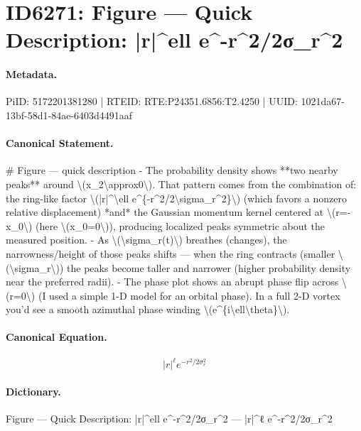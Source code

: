 \section*{ID6271: Figure — Quick Description: |r|\textasciicircum{}ell e\textasciicircum{}-r\textasciicircum{}2/2σ\_r\textasciicircum{}2}
\paragraph{Metadata.}
PiID: 5172201381280 | RTEID: RTE:P24351.6856:T2.4250 | UUID: 1021da67-13bf-58d1-84ae-6403d4491aaf

\paragraph{Canonical Statement.}
\# Figure — quick description - The probability density shows **two nearby peaks** around \textbackslash{}(x\_2\textbackslash{}approx0\textbackslash{}). That pattern comes from the combination of: the ring-like factor \textbackslash{}(|r|\textasciicircum{}\textbackslash{}ell e\textasciicircum{}\{-r\textasciicircum{}2/2\textbackslash{}sigma\_r\textasciicircum{}2\}\textbackslash{}) (which favors a nonzero relative displacement) *and* the Gaussian momentum kernel centered at \textbackslash{}(r=-x\_0\textbackslash{}) (here \textbackslash{}(x\_0=0\textbackslash{})), producing localized peaks symmetric about the measured position. - As \textbackslash{}(\textbackslash{}sigma\_r(t)\textbackslash{}) breathes (changes), the narrowness/height of those peaks shifts — when the ring contracts (smaller \textbackslash{}(\textbackslash{}sigma\_r\textbackslash{})) the peaks become taller and narrower (higher probability density near the preferred radii). - The phase plot shows an abrupt phase flip across \textbackslash{}(r=0\textbackslash{}) (I used a simple 1-D model for an orbital phase). In a full 2-D vortex you’d see a smooth azimuthal phase winding \textbackslash{}(e\textasciicircum{}\{i\textbackslash{}ell\textbackslash{}theta\}\textbackslash{}).

\paragraph{Canonical Equation.}
\[
|r|^\ell e^{-r^2/2\sigma_r^2}
\]

\paragraph{Dictionary.}
Figure — Quick Description: |r|\textasciicircum{}ell e\textasciicircum{}-r\textasciicircum{}2/2σ\_r\textasciicircum{}2 — |r|\textasciicircum{}ℓ e\textasciicircum{}-r\textasciicircum{}2/2σ\_r\textasciicircum{}2

